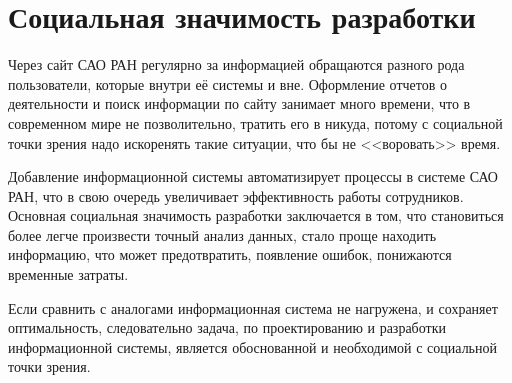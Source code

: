 \section{Социальная значимость разработки}
Через сайт САО РАН регулярно за информацией обращаются разного рода пользователи, которые внутри её системы и вне. Оформление отчетов о деятельности и поиск информации по сайту занимает много времени, что в современном мире не позволительно, тратить его в никуда, потому с социальной точки зрения надо искоренять такие ситуации, что бы не <<воровать>> время.   

Добавление информационной системы автоматизирует процессы в системе САО РАН, что в свою очередь увеличивает эффективность работы сотрудников. Основная социальная значимость разработки заключается в том, что становиться более легче произвести точный анализ данных, стало проще находить информацию, что может предотвратить, появление ошибок, понижаются временные затраты.

Если сравнить с аналогами информационная система не нагружена, и сохраняет оптимальность, следовательно задача, по проектированию и разработки информационной системы, является обоснованной и необходимой с социальной точки зрения.  

\pagebreak